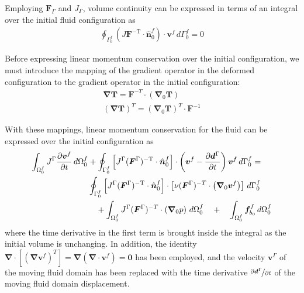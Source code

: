 \documentclass[sn-mathphys,Numbered]{sn-jnl}%
\newcommand{\bb}{\boldsymbol}
\begin{document}
Employing $\bb{F}_{\Gamma}$ and $J_\Gamma$, volume continuity can be expressed in terms of an integral over the initial fluid configuration as
\begin{eqnarray} \label{eqn:continuity_initial}
	\oint_{\Gamma^f_0}  \left( J \bb{F}^{-\text{T}} \cdot \hat{\bb{n}}_0^f \right) \cdot \bb{v}^f \, d\Gamma^f_0 = 0
\end{eqnarray}

Before expressing linear momentum conservation over the initial configuration, we must introduce the mapping of the gradient operator in the deformed configuration to the gradient operator in the initial configuration:
\begin{eqnarray}
	\bb{\nabla} \bb{T} = \bb{F}^{-T} \cdot \left( \bb{\nabla}_0 \bb{T} \right) \\
	\left( \bb{\nabla} \bb{T} \right)^T = \left( \bb{\nabla}_0 \bb{T} \right)^T \cdot  \bb{F}^{-1} 
\end{eqnarray}

With these mappings, linear momentum conservation for the fluid can be expressed over the initial configuration as
\begin{align} \label{eqn:momentum_fluid_deformed}
\int_{\Omega^f_0} J^\Gamma \frac{\partial \bb{v}^f}{\partial t} \, d\Omega^f_0
	&+ \oint_{\Gamma^f_0}  \left[ J^\Gamma (\bb{F}^\Gamma)^{-\text{T}} \cdot \hat{\bb{n}}_0^f \right] \cdot \left(\bb{v}^f - \frac{\partial \bb{d}^\Gamma}{\partial t}\right) \bb{v}^f \, d\Gamma^f_0 = \notag \\
	&\oint_{\Gamma^f_0}  \left[ J^\Gamma (\bb{F}^\Gamma)^{-\text{T}} \cdot \hat{\bb{n}}_0^f \right]
	\cdot \left[\nu (\bb{F}^\Gamma)^{-T} \cdot \left( \bb{\nabla}_0 \bb{v}^f \right) \right] \, d\Gamma^f_0 \notag \\
	&\quad + \int_{\Omega^f_0} J^\Gamma (\bb{F}^\Gamma)^{-T} \cdot \left( \bb{\nabla}_0 p \right) \, d\Omega^f_0
\quad+\quad \int_{\Omega^f_0} \bb{f}_{b_0}^f \, d\Omega^f_0
\end{align}
where the time derivative in the first term is brought inside the integral as the initial volume is unchanging.
In addition, the identity
$\bb{\nabla} \cdot \left[ \left(\bb{\nabla} \bb{v}^f \right)^T \right] = \bb{\nabla} \left( \bb{\nabla} \cdot \bb{v}^f \right) = \bb{0}$ has been employed, and the velocity $\bb{v}^\Gamma$ of the moving fluid domain has been replaced with the time derivative $\nicefrac{\partial \bb{d}^\Gamma}{\partial t}$ of the moving fluid domain displacement.
\end{document}
